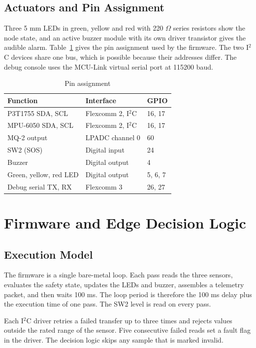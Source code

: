 \documentclass[conference]{IEEEtran}
\begin{document}
\subsection{Actuators and Pin Assignment}
Three 5 mm LEDs in green, yellow and red with 220 $\Omega$ series resistors show the node state, and an active buzzer module with its own driver transistor gives the audible alarm. Table~\ref{tab:pins} gives the pin assignment used by the firmware. The two I$^2$C devices share one bus, which is possible because their addresses differ. The debug console uses the MCU-Link virtual serial port at 115200 baud.

\begin{table}[!t]
\caption{Pin assignment}
\label{tab:pins}
\centering
\begin{tabular}{|p{1.25in}|p{1.05in}|p{0.6in}|}
\hline
\textbf{Function} & \textbf{Interface} & \textbf{GPIO} \\
\hline
P3T1755 SDA, SCL & Flexcomm 2, I$^2$C & 16, 17 \\
\hline
MPU-6050 SDA, SCL & Flexcomm 2, I$^2$C & 16, 17 \\
\hline
MQ-2 output & LPADC channel 0 & 60 \\
\hline
SW2 (SOS) & Digital input & 24 \\
\hline
Buzzer & Digital output & 4 \\
\hline
Green, yellow, red LED & Digital output & 5, 6, 7 \\
\hline
Debug serial TX, RX & Flexcomm 3 & 26, 27 \\
\hline
\end{tabular}
\end{table}

\section{Firmware and Edge Decision Logic}
\label{sec:firmware}

\subsection{Execution Model}
The firmware is a single bare-metal loop. Each pass reads the three sensors, evaluates the safety state, updates the LEDs and buzzer, assembles a telemetry packet, and then waits 100 ms. The loop period is therefore the 100 ms delay plus the execution time of one pass. The SW2 level is read on every pass.

Each I$^2$C driver retries a failed transfer up to three times and rejects values outside the rated range of the sensor. Five consecutive failed reads set a fault flag in the driver. The decision logic skips any sample that is marked invalid.
\end{document}
